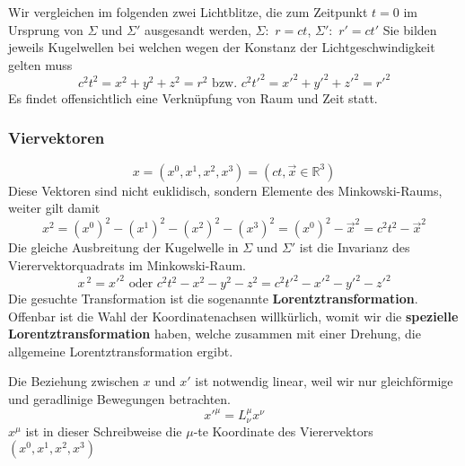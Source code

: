 \documentclass[oneside]{book}
\theoremstyle{definition}
\renewcommand{\Re}{\mathbb{R}}
\begin{document}
Wir vergleichen im folgenden zwei Lichtblitze, die zum Zeitpunkt $t=0$ im Ursprung von $\Sigma$ und $\Sigma'$ ausgesandt werden, $\Sigma:$ $r = ct$, $\Sigma':$ $r' = c t'$ Sie bilden jeweils Kugelwellen bei welchen wegen der Konstanz der Lichtgeschwindigkeit gelten muss 
$$c^2 t^2 = x^2 + y^2 + z^2 = r^2 \text{~bzw.~} c^2t'^2 = x'^2 + y'^2 + z'^2 = r'^2$$
Es findet offensichtlich eine Verknüpfung von Raum und Zeit statt.

\subsubsection{Viervektoren}
$$x = (x^0, x^1, x^2, x^3) = (ct, \vec{x}\in\Re^3)$$
Diese Vektoren sind nicht euklidisch, sondern Elemente des Minkowski-Raums, weiter gilt damit
$$x^2 = (x^0)^2 - (x^1)^2 - (x^2)^2 - (x^3)^2 = (x^0)^2 - \vec{x}^2 = c^2t^2 - \vec{x}^2$$
Die gleiche Ausbreitung der Kugelwelle in $\Sigma$ und $\Sigma'$ ist die Invarianz des Vierervektorquadrats im Minkowski-Raum.
$$x^{~2} = x'^2 \text{~oder~} c^2 t^2 - x^2 - y^2 - z^2 = c^2 t'^2 - x'^2 - y'^2 - z'^2$$
Die gesuchte Transformation ist die sogenannte \textbf{Lorentztransformation}. Offenbar ist die Wahl der Koordinatenachsen willkürlich, womit wir die \textbf{spezielle Lorentztransformation} haben, welche zusammen mit einer Drehung, die allgemeine Lorentztransformation ergibt.


Die Beziehung zwischen $x$ und $x'$ ist notwendig linear, weil wir nur gleichförmige und geradlinige Bewegungen betrachten.
$$x'^{\mu} = L^\mu_\nu x^\nu$$
$x^\mu$ ist in dieser Schreibweise die $\mu$-te Koordinate des Vierervektors $(x^0, x^1, x^2, x^3)$  
\end{document}
